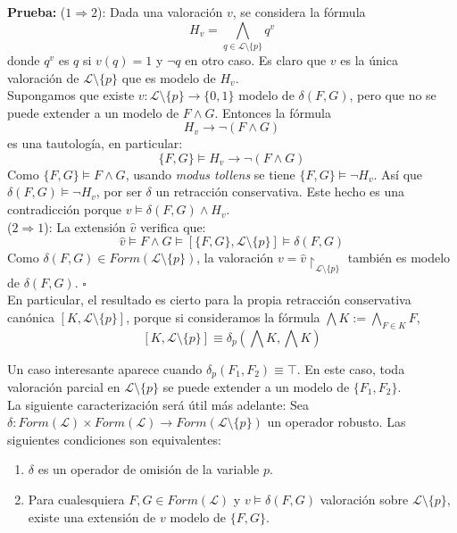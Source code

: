 \noindent \textbf{Prueba: } ($1 \Rightarrow 2$): Dada una valoración $v$, se considera la fórmula 
$$H_v = \bigwedge_{q \in \mathcal{L} \setminus \{ p \}} q^v$$
donde $q^v$ es $q$ si $v(q)=1$ y $\neg q$ en otro caso. Es claro que $v$ es la única valoración de $\mathcal{L} \setminus \{ p \}$ que es modelo de $H_v$. \\
Supongamos que existe $v  :\mathcal{L} \setminus \{p\} \rightarrow \{ 0,1 \}$ modelo de $\delta (F,G)$, pero que no se puede extender a un modelo de $F \wedge G$. Entonces la fórmula $$H_v \rightarrow \neg (F \wedge G)$$ es una tautología, en particular:
$$ \{ F,G \} \vDash H_v \rightarrow \neg (F \wedge G)$$
Como $ \{ F,G \} \vDash F \wedge G$, usando \textit{modus tollens} se tiene $\{ F,G \} \vDash \neg H_v$. Así que $\delta (F,G) \vDash \neg H_v$, por ser $\delta$ un retracción conservativa. Este hecho es una contradicción porque $v \vDash \delta (F,G) \wedge H_v$.\\
($2 \Rightarrow 1$): La extensión $\hat{v}$ verifica que:
$$\hat{v} \vDash F \wedge G \vDash [\{ F,G \} , \mathcal{L} \setminus \{ p \} ] \vDash \delta (F,G)$$
Como $\delta (F,G) \in Form(\mathcal{L} \setminus \{ p \})$, la valoración $v = \hat{v} \upharpoonright_{\mathcal{L} \setminus \{ p \}}$ también es modelo de $\delta (F,G)$. \hspace{14cm} $\square$ \\

En particular, el resultado es cierto para la propia retracción conservativa canónica $[K, \mathcal{L} \setminus \{ p \}]$, porque si consideramos la fórmula $\bigwedge K := \bigwedge_{F \in K} F$,
$$[K, \mathcal{L} \setminus \{ p \}] \equiv \delta_p (\bigwedge K , \bigwedge K)$$

Un caso interesante aparece cuando $\delta_p(F_1,F_2) \equiv \top$. En este caso, toda valoración parcial en $\mathcal{L} \setminus \{ p \}$ se puede extender a un modelo de $\{ F_1,F_2 \}$.\\

La siguiente caracterización será útil más adelante:
\cor \label{cor:robusto} Sea $\delta : Form(\mathcal{L}) \times Form(\mathcal{L}) \longrightarrow Form(\mathcal{L} \setminus \{ p \})$ un operador robusto. Las siguientes condiciones son equivalentes:
\begin{enumerate}
\item $\delta$ es un operador de omisión de la variable $p$.
\item Para cualesquiera $F,G \in Form(\mathcal{L})$ y $v \vDash \delta (F,G) $ valoración sobre $\mathcal{L} \setminus \{ p \}$, existe una extensión de $v$ modelo de $\{ F,G \}$.
\end{enumerate}

